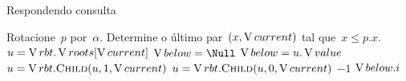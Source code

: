 \documentclass[main.tex]{subfiles}
\begin{document}
\begin{algorithm}
\caption{Respondendo consulta} \label{lst:consulta_pl}
\begin{algorithmic}[1]

	\State Rotacione~$p$ por~$\alpha$.
	\State Determine o último par~$(x, \operatorname{V}{current})$ tal que~$x \leq p.x$. 
	\State $u = \operatorname{V}{rbt}.\operatorname{V}{roots}[\operatorname{V}{current}]$
	\State $\below = \Null$
		 
			\State $\operatorname{V}{below} = u.\operatorname{V}{value}$
			\State $u = \rbt.\Call{Child}{u, 1, \current}$
		\Else
			\State $u = \rbt.\Call{Child}{u, 0, \current}$
		\EndIf
	\EndWhile
	\If{$\below = \Null$}
		\State \Return $-1$
	\Else
		\State \Return $\operatorname{V}{below}.i$
	\EndIf
\EndFunction



\end{algorithmic}
\end{algorithm}
\end{document}
